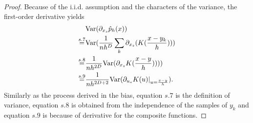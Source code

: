 \documentclass[aos,preprint]{imsart}
\theoremstyle{remark}
\begin{document}
\begin{appendix}
\begin{proof}
Because of the i.i.d. assumption and the characters of the variance, the first-order derivative yields
\[
\begin{aligned}
 &{\rm Var} (\partial_{x_s} \hat{p}_h(x))  \\
 \overset{s.7}{=} &{\rm Var} (\frac{1}{n h^D}\sum_k \partial_{x_s}(K(\frac{x-y_k}{h})))\\
 \overset{s.8} = &\frac{1}{n h^{2D}} {\rm Var}(  \partial_{x_s} K(\frac{x-y}{h}))))\\
 \overset{s.9} = & \frac{1}{n h^{2D+2}} {\rm Var} (\partial_ {u_s}  K(u)|_{u=\frac{x-y}{h}}).%
\end{aligned}
\]
Similarly as the process derived in the bias, equation $s.7$ is the definition of variance, equation $s.8$ is obtained from the independence of the samples of $y_k$ and equation $s.9$ is because of derivative for the composite functions.


\end{proof}
\end{appendix}
\end{document}
